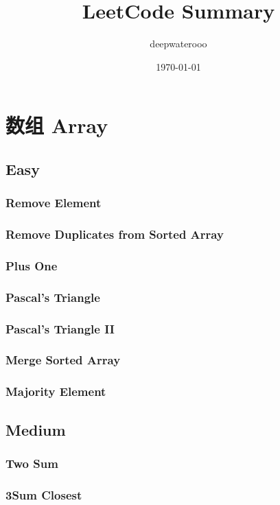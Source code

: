 \documentclass[11pt]{book}
\author{deepwaterooo}
\date{\today}
\title{LeetCode Summary}
\begin{document}
\maketitle
\tableofcontents


\chapter{数组 Array}
\label{sec-1}
\section{Easy}
\label{sec-1-1}
\subsection{Remove Element}
\label{sec-1-1-1}
\subsection{Remove Duplicates from Sorted Array}
\label{sec-1-1-2}
\subsection{Plus One}
\label{sec-1-1-3}
\subsection{Pascal's Triangle}
\label{sec-1-1-4}
\subsection{Pascal's Triangle II}
\label{sec-1-1-5}
\subsection{Merge Sorted Array}
\label{sec-1-1-6}
\subsection{Majority Element}
\label{sec-1-1-7}
\section{Medium}
\label{sec-1-2}
\subsection{Two Sum}
\label{sec-1-2-1}
\subsection{3Sum Closest}
\label{sec-1-2-2}
\end{document}
